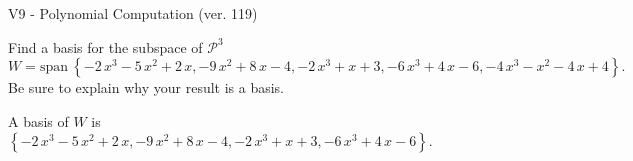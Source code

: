 \begin{exercise}
  \begin{exerciseTitle}V9 - Polynomial Computation (ver. 119)\end{exerciseTitle}
  \begin{exerciseStatement}
    Find a basis for the subspace of \(\mathcal{P}^3\) 
\[W=\mathrm{span}\ \left\{-2 \, x^{3} - 5 \, x^{2} + 2 \, x , -9 \, x^{2} + 8 \, x - 4 , -2 \, x^{3} + x + 3 , -6 \, x^{3} + 4 \, x - 6 , -4 \, x^{3} - x^{2} - 4 \, x + 4\right\}.\]
 Be sure to explain why your result is a basis.


  \end{exerciseStatement}
  \begin{exerciseAnswer}
   A basis of \(W\) is  \(\left\{-2 \, x^{3} - 5 \, x^{2} + 2 \, x , -9 \, x^{2} + 8 \, x - 4 , -2 \, x^{3} + x + 3 , -6 \, x^{3} + 4 \, x - 6\right\}\).
  


  \end{exerciseAnswer}
\end{exercise}